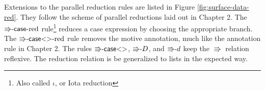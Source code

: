 
Extensions to the parallel reduction rules are listed in Figure \ref{fig:surface-data-red}.
They follow the scheme of parallel reductions laid out in Chapter
2. The $\textrm{\ensuremath{\Rrightarrow}-\ensuremath{\mathsf{case}}-red}$
rule\footnote{Also called $\iota$, or Iota reduction}
reduces a case expression by choosing the appropriate branch. The
$\textrm{\ensuremath{\Rrightarrow}-\ensuremath{\mathsf{case}}<>-red}$
rule removes the motive annotation, much like the annotation rule
in Chapter 2. The rules $\textrm{\ensuremath{\Rrightarrow}-\ensuremath{\mathsf{case}}<>}$,
$\textrm{\ensuremath{\Rrightarrow}-}D$, and $\textrm{\ensuremath{\Rrightarrow}-}d$
keep the $\Rrightarrow$ relation reflexive. The reduction relation
is be generalized to lists in the expected way.


